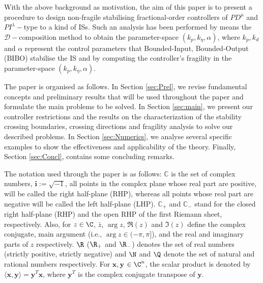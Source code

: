 \documentclass[twoside,reqno,11pt]{fcaa-var} %
\begin{document}
With the above background as motivation, the aim of this paper is to present a procedure to design non-fragile stabilising fractional-order controllers of $PD^\mu$ and $PI^\lambda-$type to a kind of ISs. Such an analysis has been performed by means  the $\mathcal{D}-$composition method \cite{gryazina2008d,gryazina2004d} to obtain the parameter-space $(k_p,k_\eta,\alpha)$, where $k_p,k_d$ and $\alpha$ represent the control parameters that Bounded-Input, Bounded-Output (BIBO) stabilise the IS and by computing the controller's fragility in the parameter-space $(k_p,k_\eta,\alpha)$.\par 
The paper is organised as follows. In Section \ref{sec:Prel}, we revise fundamental concepts and preliminary results that will be used throughout the paper and formulate the main problems to be solved. In Section \ref{sec:main}, we present our controller restrictions and the results on the characterization of the stability crossing boundaries, crossing directions and fragility analysis to solve our described problems. In Section \ref{sec:Numerics}, we analyse several specific examples to show the effectiveness and applicability of the theory. Finally, Section \ref{sec:Concl}, contains some concluding remarks.\par  
The notation used through the paper is as follows: $\mathbb{C}$ is the set of complex numbers, $\bm{i}:=\sqrt{-1}$, all points in the complex plane whose real part are positive, will be called the right half-plane (RHP), whereas all points whose real part are negative will be called the left half-plane (LHP). $\mathbb{C}_+$ and $\mathbb{C}_-$ stand for the closed right half-plane (RHP) and the open RHP of the first Riemann sheet, respectively. Also, for $z \in \C$, $\bar{z}$, $\arg{z}$, $\Re(z)$ and $\Im(z)$ define the complex conjugate, main argument (i.e., $\arg{z}\in(-\pi,\pi]$), and the real and imaginary parts of $z$ respectively. $\R$ ($\R_+$ and $\R_-$) denotes the set of real numbers (strictly positive, strictly negative) and $\N$ and $\Q$ denote the set of natural and rational numbers respectively. For $\bm{x},\bm{y}$ $\in {\C}^n$, the scalar product is denoted by $\langle\bm{x},\bm{y}\rangle=\bm{y}^T\bm{x}$, where $\bm{y}^T$ is the complex conjugate transpose of $\bm{y}$. 

\setcounter{section}{1}
\setcounter{equation}{0}\setcounter{theorem}{0}
\end{document}
